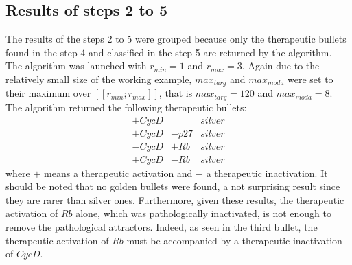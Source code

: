 \documentclass[oneside,a4paper,onecolumn,notitlepage]{article}
\begin{document}
\subsection{Results of steps 2 to 5}
The results of the steps 2 to 5 were grouped because only the therapeutic bullets found in the step 4 and classified in the step 5 are returned by the algorithm. The algorithm was launched with $r_{min}=1$ and $r_{max}=3$. Again due to the relatively small size of the working example, $max_{targ}$ and $max_{moda}$ were set to their maximum over $[\![r_{min};r_{max}]\!]$, that is $max_{targ}=120$ and $max_{moda}=8$. The algorithm returned the following therapeutic bullets:
\begin{equation*}
\begin{matrix}
+CycD&&silver\\
+CycD&-p27&silver\\
-CycD&+Rb&silver\\
+CycD&-Rb&silver
\end{matrix}
\end{equation*}
where $+$ means a therapeutic activation and $-$ a therapeutic inactivation. It should be noted that no golden bullets were found, a not surprising result since they are rarer than silver ones. Furthermore, given these results, the therapeutic activation of $Rb$ alone, which was pathologically inactivated, is not enough to remove the pathological attractors. Indeed, as seen in the third bullet, the therapeutic activation of $Rb$ must be accompanied by a therapeutic inactivation of $CycD$.
\end{document}
